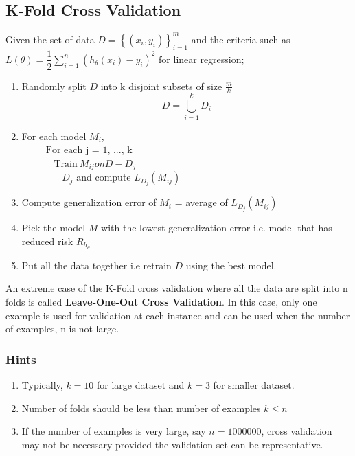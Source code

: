 \documentclass[12pt,a4paper,titlepage,portrait,openany]{book}
\begin{document}
	\subsection{K-Fold Cross Validation}
	Given the set of data $D = \left\{(x_i, y_i)\right\}_{i=1}^m$ and the criteria such as $L(\theta) = \dfrac{1}{2}\sum_{i=1}^{n}\left(h_\theta(x_i) - y_i\right)^2$ for linear regression;
	\begin{enumerate}
		\item Randomly split $D$ into k disjoint subsets of size $\frac{m}{k}$
		$$D = \bigcup\limits_{i=1}^{k}D_i$$
		\item For each model $M_i$, \\
		${}\hspace{30pt} \text{For each j = 1, ..., k}$ \\
		${}\hspace{40pt}  \text{Train}~ M_{ij} on D - D_j$ \\
		${}\hspace{40pt}$  ~$D_j$ and compute $L_{D_j}(M_{ij})$
		\item Compute generalization error of $M_i$ = average of $L_{D_j}(M_{ij})$
		\item Pick the model $M$ with the lowest generalization error i.e. model that has reduced risk $R_{h_\theta}$
		\item Put all the data together i.e retrain $D$ using the best model.
	\end{enumerate}

	An extreme case of the K-Fold cross validation where all the data are split into n folds is called \textbf{Leave-One-Out Cross Validation}. In this case, only one example is used for validation at each instance and can be used when the number of examples, n is not large.
	
	\subsubsection{Hints}
	\begin{enumerate}
		\item Typically, $k = 10$ for large dataset and $k = 3$ for smaller dataset.
		\item Number of folds should be less than number of examples $k \leq n$
		\item If the number of examples is very large, say $n  = 1000000$, cross validation may not be necessary provided the validation set can be representative.
		
	\end{enumerate}
	
\end{document}
